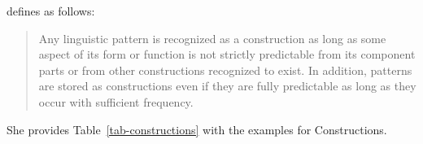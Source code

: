 \documentclass[output=paper]{langsci/langscibook}
\begin{document}
\citet[]{Goldberg2006a} defines  as follows:
\begin{quote}
Any linguistic pattern is recognized as a construction as long as some aspect of its form or
function is not strictly predictable from its component parts or from other constructions recognized
to exist. In addition, patterns are stored as constructions even if they are fully predictable as
long as they occur with sufficient frequency. \citep[]{Goldberg2006a}
\end{quote}
She provides Table~\ref{tab-constructions} with the examples for Constructions.
\begin{table}
\caption{\label{tab-constructions}Examples of constructions, varying in size and complexity according to \citet{Goldberg2009b-u}}
\end{table}
\end{document}
